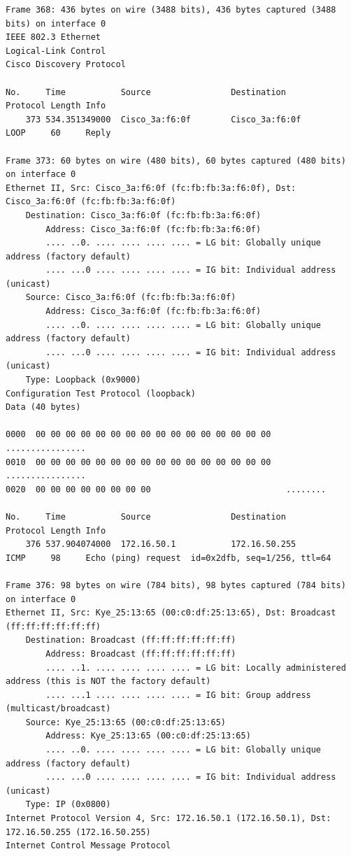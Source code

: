 \documentclass[a4paper,11pt]{article}
\begin{document}
\begin{lstlisting}
Frame 368: 436 bytes on wire (3488 bits), 436 bytes captured (3488 bits) on interface 0
IEEE 802.3 Ethernet 
Logical-Link Control
Cisco Discovery Protocol

No.     Time           Source                Destination           Protocol Length Info
    373 534.351349000  Cisco_3a:f6:0f        Cisco_3a:f6:0f        LOOP     60     Reply

Frame 373: 60 bytes on wire (480 bits), 60 bytes captured (480 bits) on interface 0
Ethernet II, Src: Cisco_3a:f6:0f (fc:fb:fb:3a:f6:0f), Dst: Cisco_3a:f6:0f (fc:fb:fb:3a:f6:0f)
    Destination: Cisco_3a:f6:0f (fc:fb:fb:3a:f6:0f)
        Address: Cisco_3a:f6:0f (fc:fb:fb:3a:f6:0f)
        .... ..0. .... .... .... .... = LG bit: Globally unique address (factory default)
        .... ...0 .... .... .... .... = IG bit: Individual address (unicast)
    Source: Cisco_3a:f6:0f (fc:fb:fb:3a:f6:0f)
        Address: Cisco_3a:f6:0f (fc:fb:fb:3a:f6:0f)
        .... ..0. .... .... .... .... = LG bit: Globally unique address (factory default)
        .... ...0 .... .... .... .... = IG bit: Individual address (unicast)
    Type: Loopback (0x9000)
Configuration Test Protocol (loopback)
Data (40 bytes)

0000  00 00 00 00 00 00 00 00 00 00 00 00 00 00 00 00   ................
0010  00 00 00 00 00 00 00 00 00 00 00 00 00 00 00 00   ................
0020  00 00 00 00 00 00 00 00                           ........

No.     Time           Source                Destination           Protocol Length Info
    376 537.904074000  172.16.50.1           172.16.50.255         ICMP     98     Echo (ping) request  id=0x2dfb, seq=1/256, ttl=64

Frame 376: 98 bytes on wire (784 bits), 98 bytes captured (784 bits) on interface 0
Ethernet II, Src: Kye_25:13:65 (00:c0:df:25:13:65), Dst: Broadcast (ff:ff:ff:ff:ff:ff)
    Destination: Broadcast (ff:ff:ff:ff:ff:ff)
        Address: Broadcast (ff:ff:ff:ff:ff:ff)
        .... ..1. .... .... .... .... = LG bit: Locally administered address (this is NOT the factory default)
        .... ...1 .... .... .... .... = IG bit: Group address (multicast/broadcast)
    Source: Kye_25:13:65 (00:c0:df:25:13:65)
        Address: Kye_25:13:65 (00:c0:df:25:13:65)
        .... ..0. .... .... .... .... = LG bit: Globally unique address (factory default)
        .... ...0 .... .... .... .... = IG bit: Individual address (unicast)
    Type: IP (0x0800)
Internet Protocol Version 4, Src: 172.16.50.1 (172.16.50.1), Dst: 172.16.50.255 (172.16.50.255)
Internet Control Message Protocol


\end{lstlisting}
\end{document}
